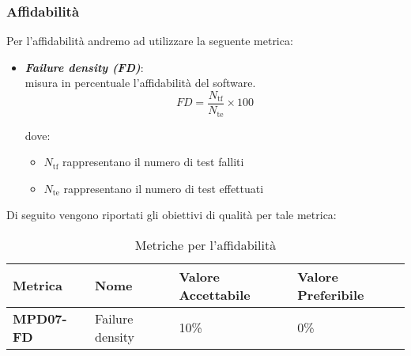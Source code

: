 \subsubsection{Affidabilità}
Per l'affidabilità andremo ad utilizzare la seguente metrica:
\begin{itemize}
    \item \textbf{\emph{Failure density (FD)}}:\\
    misura in percentuale l'affidabilità del software.
    \[
    FD = \frac{N_{\text{tf}}}{N_{\text{te}}} \times 100
    \]

    dove:
    \begin{itemize}
        \item \(N_{\text{tf}}\) rappresentano il numero di test falliti
        \item \(N_{\text{te}}\) rappresentano il numero di test effettuati
    \end{itemize}
\end{itemize}
Di seguito vengono riportati gli obiettivi di qualità per tale metrica:
\begin{table}[htbp]
    \centering
    \begin{tabular}{|>{\centering\arraybackslash}p{4cm}|p{4cm}|p{4cm}|p{4cm}|}
    \hline
    \rowcolor{gray!30}
    \textbf{Metrica} & \textbf{Nome} & \textbf{Valore Accettabile} & \textbf{Valore Preferibile} \\
    \hline
    \rowcolor{gray!10}
    \textbf{MPD07-FD} & Failure density & 10\% & 0\% \\
    \hline
    \end{tabular}
    \caption{Metriche per l'affidabilità}
    \label{tab:metriche_affidabilita}
\end{table}

\begin{comment}
\subsubsection{Sicurezza}
Per la sicurezza andremo ad utilizzare le seguenti metriche
\end{comment}

